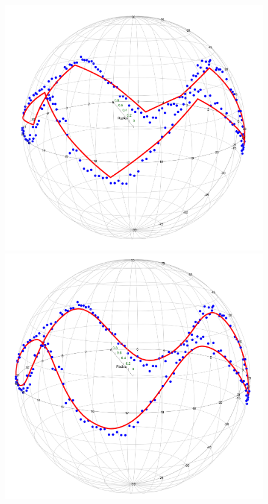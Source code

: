 \begin{figure}[h]
    \centering
    \includegraphics[scale=0.10]{figures/Hauberg(wave).png}
    \hspace{0cm}
    \includegraphics[scale=0.10]{figures/SPC(wave).png}
    \hspace{0.2cm}

\end{figure}
